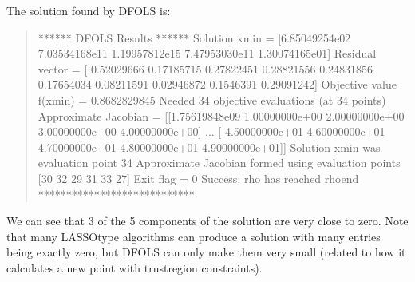 \documentclass[letterpaper,10pt,english]{sphinxmanual}
\begin{document}
\sphinxAtStartPar
The solution found by DFO\sphinxhyphen{}LS is:
\begin{quote}

\begin{sphinxVerbatim}[commandchars=\\\{\}]
****** DFO\PYGZhy{}LS Results ******
Solution xmin = [\PYGZhy{}6.85049254e\PYGZhy{}02 \PYGZhy{}7.03534168e\PYGZhy{}11  1.19957812e\PYGZhy{}15  7.47953030e\PYGZhy{}11
  1.30074165e\PYGZhy{}01]
Residual vector = [ 0.52029666 \PYGZhy{}0.17185715 \PYGZhy{}0.27822451 \PYGZhy{}0.28821556 \PYGZhy{}0.24831856 \PYGZhy{}0.17654034
 \PYGZhy{}0.08211591  0.02946872  0.1546391   0.29091242]
Objective value f(xmin) = 0.8682829845
Needed 34 objective evaluations (at 34 points)
Approximate Jacobian = [[\PYGZhy{}1.75619848e\PYGZhy{}09  1.00000000e+00  2.00000000e+00  3.00000000e+00
   4.00000000e+00]
 ...
 [ 4.50000000e+01  4.60000000e+01  4.70000000e+01  4.80000000e+01
   4.90000000e+01]]
Solution xmin was evaluation point 34
Approximate Jacobian formed using evaluation points [30 32 29 31 33 27]
Exit flag = 0
Success: rho has reached rhoend
****************************
\end{sphinxVerbatim}
\end{quote}

\sphinxAtStartPar
We can see that 3 of the 5 components of the solution are very close to zero.
Note that many LASSO\sphinxhyphen{}type algorithms can produce a solution with many entries being exactly zero, but DFO\sphinxhyphen{}LS can only make them very small (related to how it calculates a new point with trust\sphinxhyphen{}region constraints).
\end{document}

